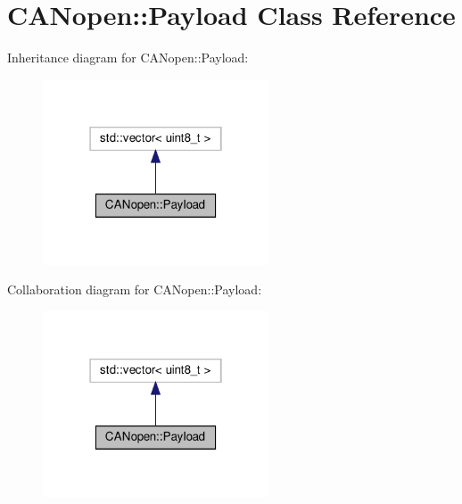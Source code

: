 \hypertarget{class_c_a_nopen_1_1_payload}{}\section{C\+A\+Nopen\+:\+:Payload Class Reference}
\label{class_c_a_nopen_1_1_payload}


Inheritance diagram for C\+A\+Nopen\+:\+:Payload\+:\nopagebreak
\begin{figure}[H]
\begin{center}
\leavevmode
\includegraphics[width=190pt]{class_c_a_nopen_1_1_payload__inherit__graph}
\end{center}
\end{figure}


Collaboration diagram for C\+A\+Nopen\+:\+:Payload\+:\nopagebreak
\begin{figure}[H]
\begin{center}
\leavevmode
\includegraphics[width=190pt]{class_c_a_nopen_1_1_payload__coll__graph}
\end{center}
\end{figure}
